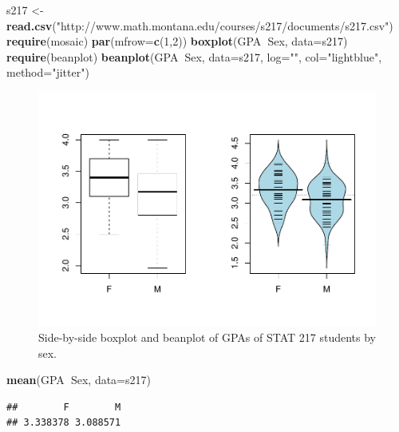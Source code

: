 \documentclass[]{book}
\newenvironment{Shaded}{\begin{snugshade}}{\end{snugshade}}
\newcommand{\KeywordTok}[1]{\textcolor[rgb]{0.13,0.29,0.53}{\textbf{#1}}}
\newcommand{\DataTypeTok}[1]{\textcolor[rgb]{0.13,0.29,0.53}{#1}}
\newcommand{\DecValTok}[1]{\textcolor[rgb]{0.00,0.00,0.81}{#1}}
\newcommand{\StringTok}[1]{\textcolor[rgb]{0.31,0.60,0.02}{#1}}
\newcommand{\OperatorTok}[1]{\textcolor[rgb]{0.81,0.36,0.00}{\textbf{#1}}}
\newcommand{\NormalTok}[1]{#1}
\begin{document}
\begin{Shaded}
\begin{Highlighting}[]
\NormalTok{s217 <-}\StringTok{ }\KeywordTok{read.csv}\NormalTok{(}\StringTok{"http://www.math.montana.edu/courses/s217/documents/s217.csv"}\NormalTok{)}
\KeywordTok{require}\NormalTok{(mosaic)}
\KeywordTok{par}\NormalTok{(}\DataTypeTok{mfrow=}\KeywordTok{c}\NormalTok{(}\DecValTok{1}\NormalTok{,}\DecValTok{2}\NormalTok{))}
\KeywordTok{boxplot}\NormalTok{(GPA}\OperatorTok{~}\NormalTok{Sex, }\DataTypeTok{data=}\NormalTok{s217)}
\KeywordTok{require}\NormalTok{(beanplot)}
\KeywordTok{beanplot}\NormalTok{(GPA}\OperatorTok{~}\NormalTok{Sex, }\DataTypeTok{data=}\NormalTok{s217, }\DataTypeTok{log=}\StringTok{""}\NormalTok{, }\DataTypeTok{col=}\StringTok{"lightblue"}\NormalTok{, }\DataTypeTok{method=}\StringTok{"jitter"}\NormalTok{)}
\end{Highlighting}
\end{Shaded}

\begin{figure}
\centering
\includegraphics{GreenwoodBanner_files/figure-latex/Figure2-15-1.pdf}
\caption{\label{fig:Figure2-15}Side-by-side boxplot and beanplot of GPAs of STAT 217
students by sex.}
\end{figure}

\begin{Shaded}
\begin{Highlighting}[]
\KeywordTok{mean}\NormalTok{(GPA}\OperatorTok{~}\NormalTok{Sex, }\DataTypeTok{data=}\NormalTok{s217)}
\end{Highlighting}
\end{Shaded}

\begin{verbatim}
##        F        M 
## 3.338378 3.088571
\end{verbatim}
\end{document}
